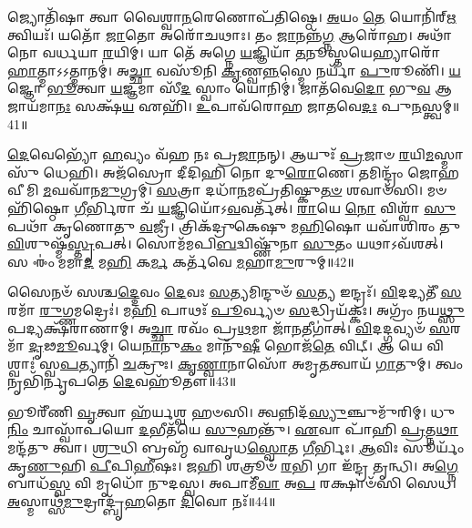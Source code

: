 𑌜𑍍𑌯𑍋𑌤𑌿᳴𑌷𑌾 𑌤𑍍𑌵𑌾 𑌵𑍈𑌶𑍍𑌵𑌾\-\ul{𑌨}\-𑌰𑍇𑌣𑍋𑌪᳴𑌤𑌿𑌷𑍍𑌠𑍇।
\-\ul{𑌅}\-𑌯𑌂 \ul{𑌤𑍇} 𑌯𑍋𑌨𑌿᳴𑌰𑍍\mbox{}\-\ul{𑌋}\-𑌤𑍍𑌵𑌿𑌯𑌃᳴।
𑌯𑌤𑍋᳴ \ul{𑌜𑌾}\-𑌤𑍋 𑌅𑌰𑍋᳴𑌚𑌥𑌾𑌃।
𑌤𑌂 \ul{𑌜𑌾}\-𑌨𑌨𑍍𑌨᳴\-\ul{𑌗𑍍𑌨} 𑌆𑌰𑍋᳴𑌹।
𑌅𑌥𑌾᳴ 𑌨𑍋 𑌵𑌰𑍍𑌧𑌯𑌾 \ul{𑌰}\-𑌯𑌿𑌮𑍍।
𑌯𑌾 𑌤𑍇᳴ 𑌅𑌗𑍍𑌨𑍇 \ul{𑌯}\-𑌜𑍍𑌞𑌿𑌯𑌾᳴ \ul{𑌤}\-𑌨𑍂𑌸𑍍𑌤𑌯𑍇𑌹𑍍𑌯𑌾𑌰𑍋᳴\-\ul{𑌹𑌾}\-𑌤𑍍𑌮𑌾\-𑌽𑌽𑌤𑍍𑌮𑌾𑌨𑌮𑍍॑।
𑌅\-\ul{𑌚𑍍𑌛𑌾} 𑌵𑌸𑍂᳴𑌨𑌿 \ul{𑌕𑍃}\-𑌣𑍍𑌵\-\ul{𑌨𑍍𑌨}\-𑌸𑍍𑌮𑍇 𑌨𑌰𑍍𑌯𑌾᳴ \ul{𑌪𑍁}\-𑌰𑍂𑌣𑌿᳴।
\-\ul{𑌯}\-𑌜𑍍𑌞𑍋 \ul{𑌭𑍂}\-𑌤𑍍𑌵𑌾 \ul{𑌯}\-𑌜𑍍𑌞𑌮𑌾 𑌸𑍀᳴\-\ul{𑌦} 𑌸𑍍𑌵𑌾𑌂 𑌯𑍋𑌨𑌿𑌮𑍍॑।
𑌜𑌾𑌤᳴𑌵𑍇\-\ul{𑌦𑍋} 𑌭𑍁\-\ul{𑌵} 𑌆 𑌜𑌾𑌯᳴𑌮𑌾\-\ul{𑌨𑌃} 𑌸𑌕𑍍𑌷᳴\-\ul{𑌯} 𑌏𑌹𑌿᳴।
\-\ul{𑌉}\-𑌪𑌾𑌵᳴𑌰𑍋𑌹 𑌜𑌾𑌤𑌵𑍇\-\ul{𑌦𑌃} 𑌪𑍁\-\ul{𑌨}\-𑌸𑍍𑌤𑍍𑌵𑌮𑍍॥41॥

\-\ul{𑌦𑍇}\-𑌵𑍇𑌭𑍍𑌯𑍋᳴ \ul{𑌹}\-𑌵𑍍𑌯𑌂 𑌵᳴𑌹 𑌨𑌃 𑌪𑍍𑌰\-\ul{𑌜𑌾}\-𑌨𑌨𑍍।
𑌆𑌯𑍁𑌃᳴ \ul{𑌪𑍍𑌰}\-𑌜𑌾𑍞 \ul{𑌰}\-𑌯𑌿\-\ul{𑌮}\-𑌸𑍍𑌮𑌾𑌸𑍁᳴ 𑌧𑍇𑌹𑌿।
𑌅𑌜᳴𑌸𑍍𑌰𑍋 𑌦𑍀𑌦𑌿𑌹𑌿 𑌨𑍋 𑌦𑍁\-\ul{𑌰𑍋}\-𑌣𑍇।
𑌤𑌮𑌿𑌨𑍍𑌦𑍍𑌰𑌂᳴ 𑌜𑍋𑌹𑌵𑍀𑌮𑌿 \ul{𑌮}\-𑌘𑌵𑌾᳴𑌨\-\ul{𑌮𑍁}\-𑌗𑍍𑌰𑌮𑍍।
\-\ul{𑌸}\-𑌤𑍍𑌰𑌾 𑌦𑌧𑌾᳴\-\ul{𑌨}\-𑌮𑌪𑍍𑌰᳴𑌤𑌿𑌷𑍍𑌕𑍁\-\ul{𑌤}\-\-\ul{𑍞} 𑌶𑌵𑌾𑍞᳴𑌸𑌿।
𑌮𑍞𑌹𑌿᳴𑌷𑍍𑌠𑍋 \ul{𑌗𑍀}\-𑌰𑍍𑌭𑌿𑌰𑌾 𑌚᳴ \ul{𑌯}\-𑌜𑍍𑌞𑌿𑌯𑍋᳴\-𑌽\-\ul{𑌵}\-𑌵𑌰𑍍𑌤᳴𑌤𑍍।
\-\ul{𑌰𑌾}\-𑌯𑍇 \ul{𑌨𑍋} 𑌵𑌿𑌶𑍍𑌵𑌾᳴ \ul{𑌸𑍁}\-𑌪𑌥𑌾᳴ 𑌕𑍃𑌣𑍋𑌤𑍁 \ul{𑌵}\-𑌜𑍍𑌰𑍀।
𑌤𑍍𑌰𑌿𑌕᳴𑌦𑍍𑌰𑍁𑌕𑍇𑌷𑍁 𑌮\-\ul{𑌹𑌿}\-𑌷𑍋 𑌯𑌵𑌾᳴𑌶𑌿𑌰𑌂 𑌤𑍁\-\ul{𑌵𑌿}\-𑌶𑍁𑌷𑍍𑌮᳴\-\ul{𑌸𑍍𑌤𑍃}\-𑌪𑌤𑍍।
𑌸𑍋𑌮᳴𑌮𑌪𑌿\-\ul{𑌬}\-𑌦𑍍𑌵𑌿𑌷𑍍𑌣𑍁᳴𑌨𑌾 \ul{𑌸𑍁}\-𑌤𑌂 𑌯𑌥𑌾\-𑌽𑌵᳴𑌶𑌤𑍍।
𑌸 𑌈𑌂॑ 𑌮𑌮𑌾\-\ul{𑌦} 𑌮\-\ul{𑌹𑌿} 𑌕\-\ul{𑌰𑍍𑌮} 𑌕𑌰𑍍𑌤᳴𑌵𑍇 \ul{𑌮}\-𑌹𑌾\-\ul{𑌮𑍁}\-𑌰𑍁𑌮𑍍॥42॥

𑌸𑍈𑌨𑍞᳴ 𑌸𑌶𑍍𑌚\-\ul{𑌦𑍍𑌦𑍇}\-𑌵𑌂 \ul{𑌦𑍇}\-𑌵𑌃 \ul{𑌸}\-𑌤𑍍𑌯𑌮𑌿𑌨𑍍𑌦𑍁𑍞᳴ \ul{𑌸}\-𑌤𑍍𑌯 𑌇𑌨𑍍𑌦𑍍𑌰𑌃᳴।
\-\ul{𑌵𑌿}\-𑌦𑌦𑍍𑌯𑌤𑍀᳴ \ul{𑌸}\-𑌰𑌮𑌾᳴ \ul{𑌰𑍁}\-𑌗𑍍𑌣𑌮𑌦𑍍𑌰𑍇𑌃॑।
𑌮\-\ul{𑌹𑌿} 𑌪𑌾𑌥𑌃᳴ \ul{𑌪𑍂}\-𑌰𑍍𑌵𑍍𑌯𑍞 \ul{𑌸}\-𑌦𑍍𑌧𑍍𑌰𑌿𑌯᳴𑌕𑍍𑌕𑌃।
𑌅𑌗𑍍𑌰𑌂᳴ 𑌨𑌯\-\ul{𑌥𑍍𑌸𑍁}\-𑌪𑌦𑍍𑌯𑌕𑍍𑌷᳴𑌰𑌾𑌣𑌾𑌮𑍍।
𑌅\-\ul{𑌚𑍍𑌛𑌾} 𑌰𑌵𑌂᳴ 𑌪𑍍𑌰\-\ul{𑌥}\-𑌮𑌾 𑌜𑌾᳴\-\ul{𑌨}\-𑌤𑍀𑌗𑌾॑𑌤𑍍।
\-\ul{𑌵𑌿}\-𑌦𑌦𑍍𑌗𑌵𑍍𑌯𑍞᳴ \ul{𑌸}\-𑌰𑌮𑌾᳴ \ul{𑌦𑍃}\-𑌢\-\ul{𑌮𑍂}\-𑌰𑍍𑌵𑌮𑍍।
𑌯𑍇\-\ul{𑌨𑌾}\-𑌨𑍁\-\ul{𑌕𑌂} 𑌮𑌾𑌨𑍁᳴\-\ul{𑌷𑍀} 𑌭𑍋𑌜᳴\-\ul{𑌤𑍇} 𑌵𑌿𑌟𑍍।
𑌆 𑌯𑍇 𑌵𑌿𑌶𑍍𑌵𑌾𑌃॑ 𑌸𑍍𑌵\-\ul{𑌪}\-𑌤𑍍𑌯𑌾𑌨𑌿᳴ \ul{𑌚}\-𑌕𑍍𑌰𑍁𑌃।
\-\ul{𑌕𑍃}\-\-\ul{𑌣𑍍𑌵𑌾}\-𑌨𑌾𑌸𑍋᳴ 𑌅𑌮𑍃\-\ul{𑌤}\-𑌤𑍍𑌵𑌾𑌯᳴ \ul{𑌗𑌾}\-𑌤𑍁𑌮𑍍।
𑌤𑍍𑌵𑌂 𑌨𑍃𑌭𑌿᳴𑌰𑍍𑌨𑍃𑌪𑌤𑍇 \ul{𑌦𑍇}\-𑌵𑌹𑍂᳴𑌤𑍗॥43॥

𑌭𑍂𑌰𑍀᳴𑌣𑌿 \ul{𑌵𑍃}\-𑌤𑍍𑌵𑌾 𑌹᳴𑌰𑍍𑌯𑌶𑍍𑌵 𑌹𑍞𑌸𑌿।
𑌤𑍍𑌵𑌨𑍍𑌨𑌿𑌦᳴\-\ul{𑌸𑍍𑌯𑍁}\-𑌞𑍍𑌚𑍁𑌮𑍁᳴𑌰𑌿𑌮𑍍।
𑌧𑍁\-\ul{𑌨𑌿𑌂} 𑌚𑌾𑌸𑍍𑌵𑌾᳴𑌪𑌯𑍋 \ul{𑌦}\-𑌭𑍀𑌤᳴𑌯𑍇 \ul{𑌸𑍁}\-𑌹𑌨𑍍𑌤𑍁᳴।
\-\ul{𑌏}\-𑌵𑌾 𑌪𑌾᳴𑌹𑌿 \ul{𑌪𑍍𑌰}\-𑌤𑍍𑌨\-\ul{𑌥𑌾} 𑌮𑌨𑍍𑌦᳴𑌤𑍁 𑌤𑍍𑌵𑌾।
\-\ul{𑌶𑍍𑌰𑍁}\-𑌧𑌿 𑌬𑍍𑌰𑌹𑍍𑌮᳴ 𑌵𑌾𑌵𑍃𑌧\-\ul{𑌸𑍍𑌵𑍋}\-𑌤 \ul{𑌗𑍀}\-𑌰𑍍𑌭𑌿𑌃।
\-\ul{𑌆}\-𑌵𑌿𑌃 𑌸𑍂𑌰𑍍𑌯𑌂᳴ 𑌕𑍃\-\ul{𑌣𑍁}\-𑌹𑌿 \ul{𑌪𑍀}\-𑌪𑌿\-\ul{𑌹𑍀}\-𑌷𑌃।
\-\ul{𑌜}\-𑌹𑌿 𑌶𑌤𑍍𑌰𑍂𑍞᳴ \ul{𑌰}\-𑌭𑌿 𑌗𑌾 𑌇᳴𑌨𑍍𑌦𑍍𑌰 𑌤𑍃𑌨𑍍𑌧𑌿।
𑌅\-\ul{𑌗𑍍𑌨𑍇} 𑌬𑌾𑌧᳴\-\ul{𑌸𑍍𑌵} 𑌵𑌿 𑌮𑍃𑌧𑍋᳴ 𑌨𑍁𑌦𑌸𑍍𑌵।
𑌅𑌪𑌾𑌮𑍀᳴\-\ul{𑌵𑌾} 𑌅\-\ul{𑌪} 𑌰𑌕𑍍𑌷𑌾𑍞᳴𑌸𑌿 𑌸𑍇𑌧।
\-\ul{𑌅}\-𑌸𑍍𑌮𑌾𑌥𑍍𑌸᳴\-\ul{𑌮𑍁}\-𑌦𑍍𑌰𑌾𑌦𑍍𑌬𑍃᳴\-\ul{𑌹}\-𑌤𑍋 \ul{𑌦𑌿}\-𑌵𑍋 𑌨𑌃᳴॥44॥

